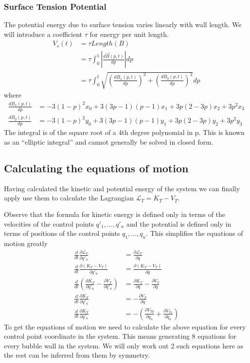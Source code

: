 \documentclass{article}
\begin{document}
\subsubsection{Surface Tension Potential}
The potential energy due to surface tension varies linearly with wall length. We
will introduce a coefficient $\tau$ for energy per unit length.
\begin{align}
V_s(t)&=\tau Length(B)\\
&=\tau \int_0^1 \left|\frac{d \vec{B}(p,t)}{dp}\right| dp \nonumber\\
&=\tau \int_0^1 \sqrt{\left(\frac{d B_x(p,t)}{dp}\right)^2+\left(\frac{d
B_y(p,t)}{dp}\right)^2} dp \nonumber
\end{align}
where
\begin{align*}
\frac{d B_x(p,t)}{dp}&= -3(1-p)^2x_0 +3(3p-1) (p-1)x_1+3p(2-3p)x_2 +3p^2x_3\\
\frac{d B_y(p,t)}{dp}&= -3(1-p)^2y_0 +3(3p-1) (p-1)y_1+3p(2-3p)y_2 +3p^2y_3
\end{align*}
The integral is of the square root of a 4th degree polynomial in p. This is
known as an ``elliptic integral'' and cannot generally be solved in closed
form.
\subsection{Calculating the equations of motion}
Having calculated the kinetic and potential energy of the system we can finally
apply use them to calculate the Lagrangian $\mathcal{L}_T=K_T-V_T$.

Observe that the formula for kinetic energy is defined only in terms of
the velocities of the control points $q'_1,\dots,q'_n$ and the potential is
defined only in terms of positions of the control points $q_1,\dots,q_n$.
This simplifies the equations of motion greatly
\begin{align*}
\frac{d}{d t}\frac{\partial \mathcal{L}_T}{\partial q'_n} 
&=\frac{\partial \mathcal{L}_T}{\partial q} \\
\frac{d}{d t}\frac{\partial (K_T-V_T)}{\partial q'_n}
&= \frac{\partial (K_T-V_T)}{\partial q} \\
\frac{d}{d t}\left( \frac{\partial K_T}{\partial q'_n} - \frac{\partial
V_T}{\partial q'_n}\right)
&=\frac{\partial K_T}{\partial q}-\frac{\partial V_T}{\partial q} \\
\frac{d}{d t} \frac{\partial K_T}{\partial q'_n}
&=-\frac{\partial V_T}{\partial q}\\
\frac{d}{d t} \frac{\partial K_T}{\partial q'_n}
&= -\left(\frac{\partial V_{Tp}}{\partial q_n}+\frac{\partial V_{Ts}}{\partial
q_n}\right)
\end{align*}
To get the equations of motion we need to calculate the above equation for every
control point coordinate in the system. This means generating 8 equations for
every bubble wall in the system. We will only work out 2 such equations here as
the rest can be inferred from them by symmetry.
\end{document}
